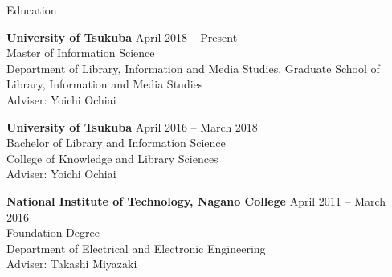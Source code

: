 \documentclass{resume} %
\begin{document}

\begin{rSection}{Education}

    {\bf University of Tsukuba} \hfill {April 2018 -- Present}
    \\ Master of Information Science
    \\ Department of Library, Information and Media Studies, Graduate School of Library, Information and Media Studies
    \\ Adviser: Yoichi Ochiai

    {\bf University of Tsukuba} \hfill {April 2016 -- March 2018}
    \\ Bachelor of Library and Information Science
    \\ College of Knowledge and Library Sciences
    \\ Adviser: Yoichi Ochiai

    {\bf National Institute of Technology, Nagano College} \hfill {April 2011 -- March 2016}
    \\ Foundation Degree
    \\ Department of Electrical and Electronic Engineering
    \\ Adviser: Takashi Miyazaki

\end{rSection}

\end{document}
